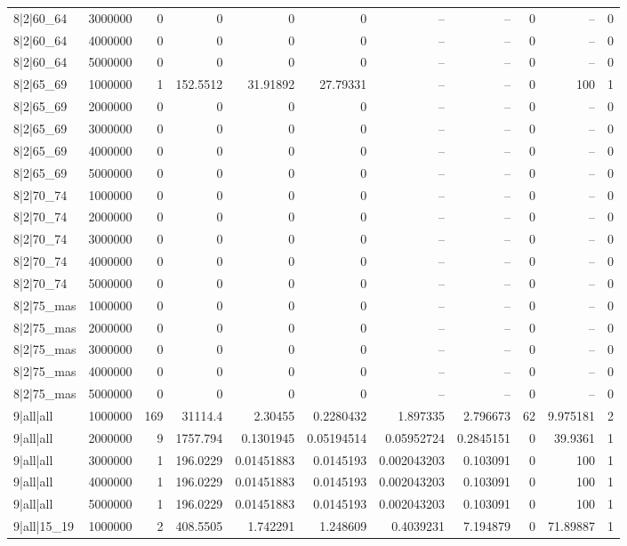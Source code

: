 \begin{tabular}{lrrrrrrrrrr}
8|2|60\_64 & 3000000 & 0 & 0 & 0 & 0 & -- & -- & 0 & -- & 0 \\
8|2|60\_64 & 4000000 & 0 & 0 & 0 & 0 & -- & -- & 0 & -- & 0 \\
8|2|60\_64 & 5000000 & 0 & 0 & 0 & 0 & -- & -- & 0 & -- & 0 \\
8|2|65\_69 & 1000000 & 1 & 152.5512 & 31.91892 & 27.79331 & -- & -- & 0 & 100 & 1 \\
8|2|65\_69 & 2000000 & 0 & 0 & 0 & 0 & -- & -- & 0 & -- & 0 \\
8|2|65\_69 & 3000000 & 0 & 0 & 0 & 0 & -- & -- & 0 & -- & 0 \\
8|2|65\_69 & 4000000 & 0 & 0 & 0 & 0 & -- & -- & 0 & -- & 0 \\
8|2|65\_69 & 5000000 & 0 & 0 & 0 & 0 & -- & -- & 0 & -- & 0 \\
8|2|70\_74 & 1000000 & 0 & 0 & 0 & 0 & -- & -- & 0 & -- & 0 \\
8|2|70\_74 & 2000000 & 0 & 0 & 0 & 0 & -- & -- & 0 & -- & 0 \\
8|2|70\_74 & 3000000 & 0 & 0 & 0 & 0 & -- & -- & 0 & -- & 0 \\
8|2|70\_74 & 4000000 & 0 & 0 & 0 & 0 & -- & -- & 0 & -- & 0 \\
8|2|70\_74 & 5000000 & 0 & 0 & 0 & 0 & -- & -- & 0 & -- & 0 \\
8|2|75\_mas & 1000000 & 0 & 0 & 0 & 0 & -- & -- & 0 & -- & 0 \\
8|2|75\_mas & 2000000 & 0 & 0 & 0 & 0 & -- & -- & 0 & -- & 0 \\
8|2|75\_mas & 3000000 & 0 & 0 & 0 & 0 & -- & -- & 0 & -- & 0 \\
8|2|75\_mas & 4000000 & 0 & 0 & 0 & 0 & -- & -- & 0 & -- & 0 \\
8|2|75\_mas & 5000000 & 0 & 0 & 0 & 0 & -- & -- & 0 & -- & 0 \\
9|all|all & 1000000 & 169 & 31114.4 & 2.30455 & 0.2280432 & 1.897335 & 2.796673 & 62 & 9.975181 & 2 \\
9|all|all & 2000000 & 9 & 1757.794 & 0.1301945 & 0.05194514 & 0.05952724 & 0.2845151 & 0 & 39.9361 & 1 \\
9|all|all & 3000000 & 1 & 196.0229 & 0.01451883 & 0.0145193 & 0.002043203 & 0.103091 & 0 & 100 & 1 \\
9|all|all & 4000000 & 1 & 196.0229 & 0.01451883 & 0.0145193 & 0.002043203 & 0.103091 & 0 & 100 & 1 \\
9|all|all & 5000000 & 1 & 196.0229 & 0.01451883 & 0.0145193 & 0.002043203 & 0.103091 & 0 & 100 & 1 \\
9|all|15\_19 & 1000000 & 2 & 408.5505 & 1.742291 & 1.248609 & 0.4039231 & 7.194879 & 0 & 71.89887 & 1 \\

\end{tabular}

